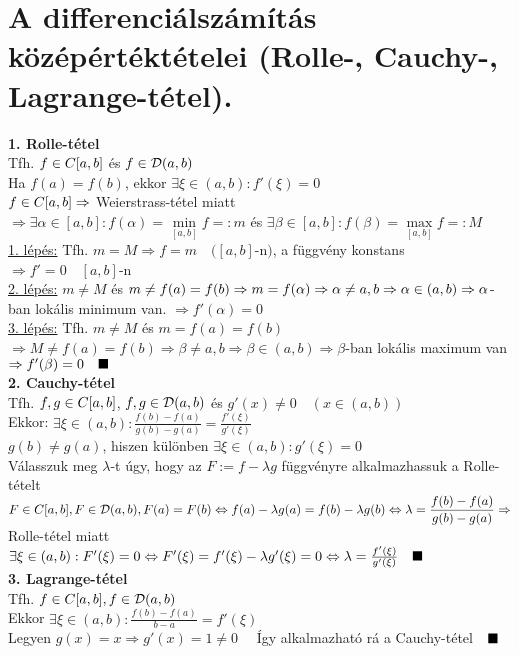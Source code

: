 \documentclass[a4paper,12pt]{article}
\begin{document}
\section{A differenciálszámítás középértéktételei (Rolle-, Cauchy-, Lagrange-tétel).}
\textbf{1. Rolle-tétel}\\[0.1cm]\tetel Tfh. $f\in C[a,b]$ és $f\in \displaystyle\mathcal{D}(a,b)$\\[0.2cm]Ha
$f(a)=f(b)$, ekkor $\exists\xi\in(a,b):f'(\xi)=0$\\[0.2cm]\biz $f\in C[a,b]\Rightarrow$
Weierstrass-tétel miatt\\[0.2cm]$\Rightarrow\exists\alpha\in[a,b]:f(\alpha)=
\min\limits_{[a,b]}f=:m$ és $\exists\beta\in[a,b]:f(\beta)= \max\limits_{[a,b]}f=:M$
\\[0.2cm]\underline{1. lépés:} Tfh. $m=M\Rightarrow f=m\quad([a,b]$-n$)$, a függvény
konstans $\Rightarrow f'=0\quad[a,b]$-n\\[0.2cm]\underline{2. lépés:} $m\neq M$ és
$m\neq f(a)=f(b)\Rightarrow m=f(\alpha)\Rightarrow\alpha\neq a,b
\Rightarrow\alpha\in(a,b)\\[0.2cm]\Rightarrow\alpha$-ban lokális minimum van.
$\Rightarrow f'(\alpha)=0$\\[0.2cm]\underline{3. lépés:} Tfh. $m\neq M$ és $m=f(a)
=f(b)$\\[0.2cm]$\Rightarrow M\neq f(a)=f(b)\Rightarrow\beta\neq a,b\Rightarrow\beta
\in(a,b)\Rightarrow\beta$-ban lokális maximum van $\Rightarrow f'(\beta)=0\quad\blacksquare$
\\[0.2cm]\textbf{2. Cauchy-tétel}\\[0.1cm]\tetel Tfh. $f,g\in C[a,b]$, $f,g\in \displaystyle\mathcal{D}(a,b)$ és
$g'(x)\neq0\quad(x\in(a,b))$\\[0.2cm]Ekkor: $\exists\xi\in(a,b):
\frac{f(b)-f(a)}{g(b)-g(a)}=\frac{f'(\xi)}{g'(\xi)}$\\[0.2cm]\biz
$g(b)\neq g(a)$, hiszen különben $\exists\xi\in(a,b):g'(\xi)=0$\\[0.2cm]Válasszuk meg
$\lambda$-t úgy, hogy az $F:=f-\lambda g$ függvényre alkalmazhassuk a
Rolle-tételt\\[0.2cm]$F\in C[a,b],F\in \displaystyle\mathcal{D}(a,b), F(a)=F(b)\Leftrightarrow f(a)-\lambda g(a)=
f(b)-\lambda g(b)\Leftrightarrow\lambda=\frac{f(b)-f(a)}{g(b)-g(a)}\\[0.2cm]
\Rightarrow$ Rolle-tétel miatt $\exists\xi\in(a,b):F'(\xi)=0\Leftrightarrow F'(\xi)
=f'(\xi)-\lambda g'(\xi)=0\Leftrightarrow\lambda=\frac{f'(\xi)}{g'(\xi)}\quad\blacksquare$
\\[0.2cm]\textbf{3. Lagrange-tétel}\\[0.1cm]\tetel Tfh. $f\in C[a,b],f\in \displaystyle\mathcal{D}(a,b)$\\[0.2cm]Ekkor
$\exists\xi\in(a,b):\frac{f(b)-f(a)}{b-a}=f'(\xi)$\\[0.2cm]\biz Legyen $g(x)=x
\Rightarrow g'(x)=1\neq0\quad$ Így alkalmazható rá a Cauchy-tétel$\quad\blacksquare$
\newpage
\end{document}
